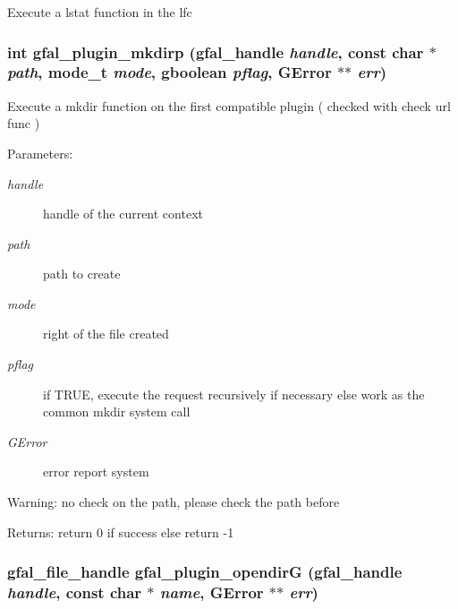 Execute a lstat function in the lfc 
\subsubsection{\setlength{\rightskip}{0pt plus 5cm}int gfal\_\-plugin\_\-mkdirp (gfal\_\-handle {\em handle}, const char $\ast$ {\em path}, mode\_\-t {\em mode}, gboolean {\em pflag}, GError $\ast$$\ast$ {\em err})}\label{gfal__common__plugin_8c_815a97902a1067b99f9bcc2f63b19e11}


Execute a mkdir function on the first compatible plugin ( checked with check url func ) \begin{Desc}
\item[Parameters:]
\begin{description}
\item[{\em handle}]handle of the current context \item[{\em path}]path to create \item[{\em mode}]right of the file created \item[{\em pflag}]if TRUE, execute the request recursively if necessary else work as the common mkdir system call \item[{\em GError}]error report system \end{description}
\end{Desc}
\begin{Desc}
\item[Warning:]no check on the path, please check the path before \end{Desc}
\begin{Desc}
\item[Returns:]return 0 if success else return -1 \end{Desc}
\subsubsection{\setlength{\rightskip}{0pt plus 5cm}gfal\_\-file\_\-handle gfal\_\-plugin\_\-opendir\-G (gfal\_\-handle {\em handle}, const char $\ast$ {\em name}, GError $\ast$$\ast$ {\em err})}\label{gfal__common__plugin_8c_0f8363d00d0f3418edaef414a84df034}


